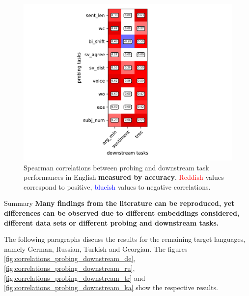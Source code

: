 \begin{figure}[h]
	\centering
	\includegraphics[scale=0.625]{images/spearman_corr_en_acc}
	\caption[Spearman correlations between probing and downstream task performances in English (accuracy)]
		{Spearman correlations between probing and downstream task performances in English 
		\textbf{measured by accuracy}. \textcolor{red}{Reddish} values correspond to positive, \textcolor{blue}{blueish} values
		to negative correlations.}
	\label{fig:sp_corr_probing_downstream_en_acc}
\end{figure}

\begin{tudbox}{Summary}
	\textbf{Many findings from the literature can be reproduced, yet differences can be observed due to different
	embeddings considered, different data sets or different probing and downstream tasks.}
\end{tudbox}

 The following paragraphs discuss the results for the remaining target languages, namely German, Russian, Turkish and Georgian. The figures \vref{fig:correlations_probing_downstream_de}, \vref{fig:correlations_probing_downstream_ru}, \vref{fig:correlations_probing_downstream_tr} and \vref{fig:correlations_probing_downstream_ka} show the respective results.

